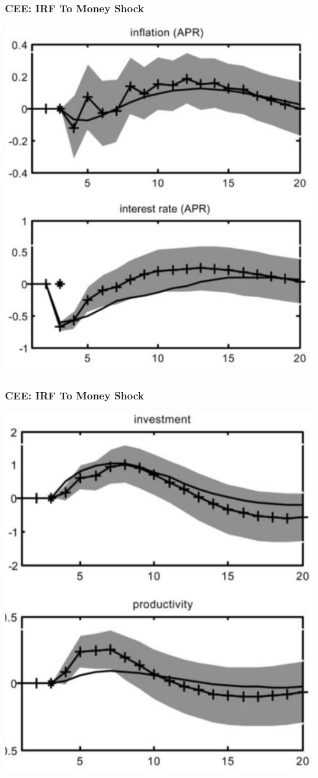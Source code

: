 \documentclass[english,xcolor=svgnames]{beamer}
\begin{document}
\begin{frame}
\frametitle{CEE: IRF To Money Shock
}
\centering
\includegraphics[scale=0.6]{../../Images/CEE2005-1.png}
\end{frame}

\begin{frame}
\frametitle{CEE: IRF To Money Shock
}
\centering
\includegraphics[scale=0.6]{../../Images/CEE2005-2.png}
\end{frame}
\end{document}
